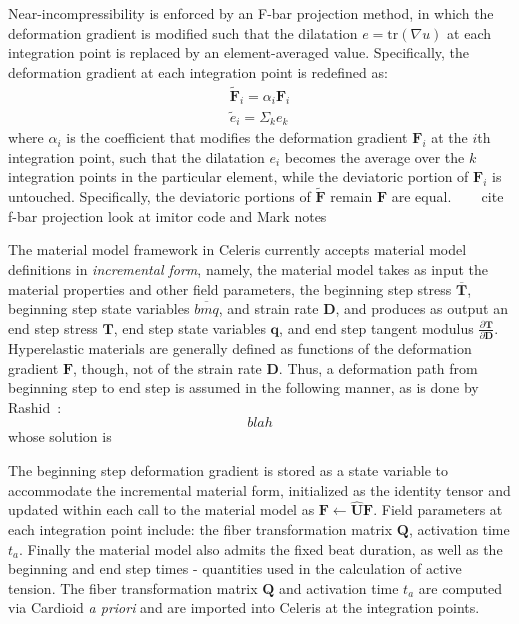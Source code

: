 
Near-incompressibility is enforced by an F-bar projection method, in which the deformation gradient is modified such that the dilatation $e = \text{tr}(\nabla{u})$ at each integration point is replaced by an element-averaged value. Specifically, the deformation gradient at each integration point is redefined as:
\begin{align}
\tilde{\bm{F}}_i = \alpha_i\bm{F}_i \\
\tilde{e}_i = \Sigma_k e_k
\end{align}
where $\alpha_i$ is the coefficient that modifies the deformation gradient $\bm{F}_i$ at the $i$th integration point, such that the dilatation $e_i$ becomes the average over the $k$ integration points in the particular element, while the deviatoric portion of $\bm{F}_i$ is untouched. Specifically, the deviatoric portions of $\tilde{\bm{F}}$ remain $\bm{F}$ are equal.
~~~
cite f-bar projection
look at imitor code and Mark notes
~~~

The material model framework in Celeris currently accepts material model definitions in \textit{incremental form}, namely, the material model takes as input the material properties and other field parameters, the beginning step stress $\overline{\bm{T}}$, beginning step state variables $\overline{bm{q}}$, and strain rate $\bm{D}$, and produces as output an end step stress $\bm{T}$, end step state variables $\bm{q}$, and end step tangent modulus $\frac{\partial \bm{T}}{\partial \bm{D}}$. Hyperelastic materials are generally defined as functions of the deformation gradient $\bm{F}$, though, not of the strain rate $\bm{D}$. Thus, a deformation path from beginning step to end step is assumed in the following manner, as is done by Rashid~\cite{}:
\begin{equation}
blah
\end{equation}
whose solution is 

The beginning step deformation gradient is stored as a state variable to accommodate the incremental material form, initialized as the identity tensor and updated within each call to the material model as $\bm{F} \leftarrow \hat{\bm{U}}\bm{F}$. Field parameters at each integration point include: the fiber transformation matrix $\bm{Q}$, activation time $t_a$. Finally the material model also admits the fixed beat duration, as well as the beginning and end step times - quantities used in the calculation of active tension. The fiber transformation matrix $\bm{Q}$ and activation time $t_a$ are computed via Cardioid \textit{a priori} and are imported into Celeris at the integration points.

